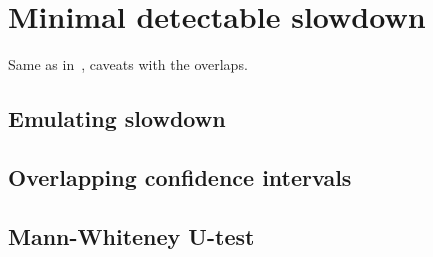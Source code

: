 \section{Minimal detectable slowdown}
\label{sec:mds}

Same as in~\citet{laaber2019software}, caveats with the overlaps.

\subsection{Emulating slowdown}

\subsection{Overlapping confidence intervals}

\subsection{Mann-Whiteney U-test}
